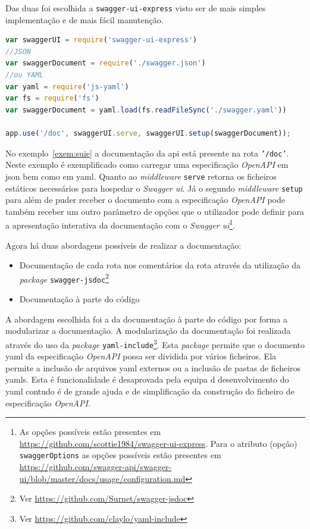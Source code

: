Das duas foi escolhida a \texttt{swagger-ui-express} visto ser de mais simples implementação e de mais fácil manutenção.

\begin{lstlisting}[language=javascript, caption=Exemplo de uso do \texttt{swagger-ui-express}, label=exem:suie]
var swaggerUI = require('swagger-ui-express')
//JSON
var swaggerDocument = require('./swagger.json')
//ou YAML
var yaml = require('js-yaml')
var fs = require('fs')
var swaggerDocument = yaml.load(fs.readFileSync('./swagger.yaml'))

app.use('/doc', swaggerUI.serve, swaggerUI.setup(swaggerDocument));
\end{lstlisting}

No exemplo~\ref{exem:suie} a documentação da \acrshort{api} está presente na rota \texttt{'/doc'}. Neste exemplo é exemplificado como carregar uma especificação \textit{OpenAPI} em \acrshort{json} bem como em \acrshort{yaml}. Quanto ao \textit{middleware} \texttt{serve} retorna os ficheiros estáticos necessários para hospedar o \textit{Swagger \acrshort{ui}}. Já o segundo \textit{middleware} \texttt{setup} para além de puder receber o documento com a especificação \textit{OpenAPI} pode também receber um outro parâmetro de opções que o utilizador pode definir para a apresentação interativa da documentação com o \textit{Swagger \acrshort{ui}}\footnote{As opções possíveis estão presentes em \url{https://github.com/scottie1984/swagger-ui-express}. Para o atributo (opção) \texttt{swaggerOptions} as opções possíveis estão presentes em \url{https://github.com/swagger-api/swagger-ui/blob/master/docs/usage/configuration.md}}.

Agora há duas abordagens possíveis de realizar a documentação:
\begin{itemize}
    \item Documentação de cada rota nos comentários da rota através da utilização da \textit{package} \texttt{swagger-jsdoc}\footnote{Ver \url{https://github.com/Surnet/swagger-jsdoc}}
    \item Documentação à parte do código
\end{itemize}

A abordagem escolhida foi a da documentação à parte do código por forma a modularizar a documentação. A modularização da documentação foi realizada através do uso da \textit{package} \texttt{yaml-include}\footnote{Ver \url{https://github.com/claylo/yaml-include}}. Esta \textit{package} permite que o documento \acrshort{yaml} da especificação \textit{OpenAPI} possa ser dividida por vários ficheiros. Ela permite a inclusão de arquivos \acrshort{yaml} externos ou a inclusão de pastas de ficheiros \acrshort{yaml}s. Esta é funcionalidade é desaprovada pela equipa d desenvolvimento do \acrshort{yaml} contudo é de grande ajuda e de simplificação da construção do ficheiro de especificação \textit{OpenAPI}.

